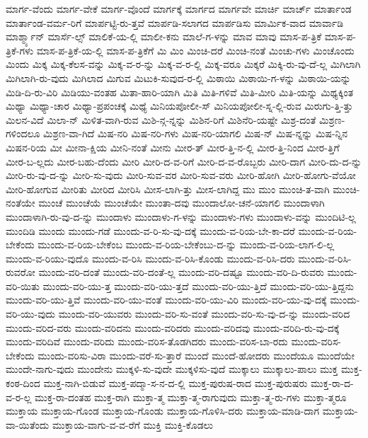 {ಮಾರ್ಗ-ವೆಂದು
ಮಾರ್ಗ-ವೇಕೆ
ಮಾರ್ಗ-ವೊಂದೆ
ಮಾರ್ಗಕ್ಕೆ
ಮಾರ್ಗದ
ಮಾರ್ಗವೇ
ಮಾರ್ಚಿ
ಮಾರ್ಚ್
ಮಾರ್ತಾಂಡ
ಮಾರ್ತಾಂಡ-ವರ್ಮ-ರಿಗೆ
ಮಾರ್ಪಟ್ಟಿ-ರು-ತ್ತವೆ
ಮಾರ್ಪಡಿ-ಸಲಾಗದ
ಮಾರ್ಪಡಿಸು
ಮಾರ್ಮಿಕ-ವಾದ
ಮಾರ್ವಾಡಿ
ಮಾರ್ಶ್ಮ್ಯಾನ್
ಮಾರ್ಸೆ-ಲ್ಸ್
ಮಾಲಿಕೆ-ಯ-ಲ್ಲಿ
ಮಾಲೀ-ಕನು
ಮಾಲೆ-ಗ-ಳನ್ನು
ಮಾವ
ಮಾವು
ಮಾಸ-ಪ-ತ್ರಿಕೆ
ಮಾಸ-ಪ-ತ್ರಿಕೆ-ಗಳು
ಮಾಸ-ಪ-ತ್ರಿಕೆ-ಯ-ಲ್ಲಿ
ಮಾಸ-ಪ-ತ್ರಿಕೆಗೆ
ಮಿ
ಮಿಂ
ಮಿಂಚಿ-ದರೆ
ಮಿಂಚಿ-ನಂತೆ
ಮಿಂಚು-ಗಳು
ಮಿಂಚೊಂದು
ಮಿಂದು
ಮಿಕ್ಕ
ಮಿಕ್ಕ-ಕೆಲಸ-ವನ್ನು
ಮಿಕ್ಕ-ವ-ರ-ನ್ನು
ಮಿಕ್ಕ-ವ-ರ-ಲ್ಲಿ
ಮಿಕ್ಕ-ವರೂ
ಮಿಕ್ಕರೆ
ಮಿಕ್ಕಿ-ರು-ವು-ದೆ-ಲ್ಲ
ಮಿಗಿಲಾಗಿ
ಮಿಗಿಲಾಗಿ-ರು-ವುದು
ಮಿಗಿಲಾದ
ಮಿಗುವ
ಮಿಟುಕಿ-ಸುವುದ-ರ-ಲ್ಲಿ
ಮಿಠಾಯಿ
ಮಿಠಾಯಿ-ಗ-ಳನ್ನು
ಮಿಠಾಯಿ-ಯನ್ನು
ಮಿಡಿ-ದಿ-ರು-ವಿರಿ
ಮಿಡಿಯು-ವಂತಹ
ಮಿತಾ-ಹಾರಿ-ಯಾಗಿ
ಮಿತಿ
ಮಿತಿ-ಗಳಿವೆ
ಮಿತಿ-ಮೀರಿ
ಮಿತಿ-ಯನ್ನು
ಮಿಥ್ಯಕ್ಕಿಂತ
ಮಿಥ್ಯಾ
ಮಿಥ್ಯಾ-ಚಾರ
ಮಿಥ್ಯಾ-ಪ್ರಪಂಚಕ್ಕೆ
ಮಿಥ್ಯೆ
ಮಿನಿಯಪೋಲೀ-ಸ್
ಮಿನಿಯಪೋಲೀ-ಸ್ನ-ಲ್ಲಿ-ರುವ
ಮಿರುಗು-ತ್ತಿ-ತ್ತು
ಮಿಲನ-ವಿದೆ
ಮಿಲಾ-ನ್
ಮಿಳಿತ-ವಾಗಿ-ರುವ
ಮಿಶಿ-ನ್ಗ-ನ್ನನ್ನು
ಮಿಶಿನ-ರಿಗೆ
ಮಿಶಿನೆರಿ-ಯಷ್ಟೇ
ಮಿಶ್ರ-ದಂತೆ
ಮಿಶ್ರಣ-ಗಳಿಂದಲೂ
ಮಿಶ್ರಣ-ವಾ-ಗಿದೆ
ಮಿಷ-ನರಿ
ಮಿಷ-ನರಿ-ಗಳು
ಮಿಷ-ನರಿ-ಯಾಗಲಿ
ಮಿಷ-ನ್
ಮಿಷ-ನ್ನನ್ನು
ಮಿಷ-ನ್ನಿನ
ಮಿಷನ-ರಿಯ
ಮೀ
ಮೀನಾ-ಕ್ಷಿಯ
ಮೀನಿ-ನಂತೆ
ಮೀನು
ಮೀರ-ತ್
ಮೀರ-ತ್ತಿ-ನ-ಲ್ಲಿ
ಮೀರ-ತ್ತಿ-ನಿಂದ
ಮೀರ-ತ್ತಿಗೆ
ಮೀರ-ಬ-ಲ್ಲದು
ಮೀರ-ಬಹು-ದೆಂದು
ಮೀರಿ
ಮೀರಿ-ದ-ವ-ರಿಗೆ
ಮೀರಿ-ದ-ವ-ರೊಬ್ಬರು
ಮೀರಿ-ದಾಗ
ಮೀರಿ-ದು-ದ-ನ್ನು
ಮೀರಿ-ರು-ವು-ದ-ನ್ನು
ಮೀರಿ-ಸು-ವುದು
ಮೀರಿ-ಸುವ-ವರ
ಮೀರಿ-ಸುವ-ವರು
ಮೀರಿ-ಹೋಗಿ
ಮೀರಿ-ಹೋಗು-ವೆಯೋ
ಮೀರಿ-ಹೋಗುವ
ಮೀರಿತು
ಮೀರಿದ
ಮೀರಿಸಿ
ಮೀಸ-ಲಾಗಿ-ತ್ತು
ಮೀಸ-ಲಾಗಿದ್ದ
ಮು
ಮುಂ
ಮುಂಚಿ-ತ-ವಾಗಿ
ಮುಂಚಿ-ನಂತೆಯೇ
ಮುಂಚೆ
ಮುಂಚೆಯೆ
ಮುಂಚೆಯೇ
ಮುಂತಾ-ದವು
ಮುಂದಾಲೋ-ಚನೆ-ಯಾಗಲಿ
ಮುಂದಾಳಾಗಿ
ಮುಂದಾಳಾಗಿ-ರು-ವು-ದ-ನ್ನು
ಮುಂದಾಳು
ಮುಂದಾಳು-ಗ-ಳನ್ನು
ಮುಂದಾಳು-ಗಳು
ಮುಂದಾಳು-ವನ್ನು
ಮುಂದಿಟಿ-ಲ್ಲ
ಮುಂದಿಡಿ
ಮುಂದು
ಮುಂದು-ಗಡೆ
ಮುಂದು-ವ-ರಿ-ಸು-ವು-ದಕ್ಕೆ
ಮುಂದು-ವ-ರಿಯ-ಬೇ-ಕಾ-ದರೆ
ಮುಂದು-ವ-ರಿಯ-ಬೇಕೆಂದು
ಮುಂದು-ವ-ರಿಯ-ಬೇಕೆಂಬ
ಮುಂದು-ವ-ರಿಯ-ಬೇಕೆಂಬು-ದ-ನ್ನು
ಮುಂದು-ವ-ರಿಯ-ಲಾಗ-ಲಿ-ಲ್ಲ
ಮುಂದು-ವ-ರಿಯು-ವುದೊ
ಮುಂದು-ವ-ರಿಸಿ
ಮುಂದು-ವ-ರಿಸಿ-ಕೊಂಡು
ಮುಂದು-ವ-ರಿಸಿ-ದರು
ಮುಂದು-ವ-ರಿಸಿ-ರುವರೋ
ಮುಂದು-ವರಿ-ದಂತೆ
ಮುಂದು-ವರಿ-ದಂತೆ-ಲ್ಲ
ಮುಂದು-ವರಿ-ದಷ್ಟೂ
ಮುಂದು-ವರಿ-ದಿ-ರುವರು
ಮುಂದು-ವರಿ-ಯಿತು
ಮುಂದು-ವರಿ-ಯು-ತ್ತ
ಮುಂದು-ವರಿ-ಯು-ತ್ತದೆ
ಮುಂದು-ವರಿ-ಯು-ತ್ತಿದೆ
ಮುಂದು-ವರಿ-ಯು-ತ್ತಿದ್ದನು
ಮುಂದು-ವರಿ-ಯು-ತ್ತಿವೆ
ಮುಂದು-ವರಿ-ಯು-ವಂತೆ
ಮುಂದು-ವರಿ-ಯು-ವಿರಿ
ಮುಂದು-ವರಿ-ಯು-ವು-ದಕ್ಕೆ
ಮುಂದು-ವರಿ-ಯು-ವುದು
ಮುಂದು-ವರಿ-ಯುವರು
ಮುಂದು-ವರಿ-ಸು-ವಂತೆ
ಮುಂದು-ವರಿ-ಸು-ವು-ದ-ನ್ನು
ಮುಂದು-ವರಿದ
ಮುಂದು-ವರಿದ-ವರು
ಮುಂದು-ವರಿದನು
ಮುಂದು-ವರಿದರು
ಮುಂದು-ವರಿದವು
ಮುಂದು-ವರಿದಿ-ರು-ವು-ದಕ್ಕೆ
ಮುಂದು-ವರಿದಿವೆ
ಮುಂದು-ವರಿದು
ಮುಂದು-ವರಿಸ-ತೊಡಗಿದರು
ಮುಂದು-ವರಿಸ-ಬಾ-ರದು
ಮುಂದು-ವರಿಸ-ಬೇಕೆಂದು
ಮುಂದು-ವರಿಸು-ವಿರಾ
ಮುಂದು-ವರೆ-ಸು-ತ್ತಾರೆ
ಮುಂದೆ
ಮುಂದೆ-ಹೋದರು
ಮುಂದೆಯೂ
ಮುಂದೆಯೇ
ಮುಂದೇ-ನಾಗು-ವುದು
ಮುಂದೇನು
ಮುಕ್ಕಳಿ-ಸು-ವುದೇ
ಮುಕ್ಕಳಿಸು-ವುದೆ
ಮುಕ್ಕಾಲು
ಮುಕ್ಕಾಲು-ಪಾಲು
ಮುಕ್ತ
ಮುಕ್ತ-ಕಂಠ-ದಿಂದ
ಮುಕ್ತ-ನಾಗಿ-ಬಿಡುವೆ
ಮುಕ್ತ-ಪದ್ಮಾ-ಸ-ನ-ದ-ಲ್ಲಿ
ಮುಕ್ತ-ಪುರುಷ-ರಾದ
ಮುಕ್ತ-ಪುರುಷರು
ಮುಕ್ತ-ರಾ-ದ-ವ-ರ-ಲ್ಲ
ಮುಕ್ತ-ರಾ-ದಂತಹ
ಮುಕ್ತ-ರಾಗಿ
ಮುಕ್ತಾ-ತ್ಮ
ಮುಕ್ತಾ-ತ್ಮ-ರಾಗುವುದು
ಮುಕ್ತಾ-ತ್ಮ-ರು-ಗಳು
ಮುಕ್ತಾ-ತ್ಮರೂ
ಮುಕ್ತಾಯ
ಮುಕ್ತಾಯ-ಗೊಂಡ
ಮುಕ್ತಾಯ-ಗೊಂಡು
ಮುಕ್ತಾಯ-ಗೊಳಿಸಿ-ದರು
ಮುಕ್ತಾಯ-ಮಾಡಿ-ದಾಗ
ಮುಕ್ತಾಯ-ವಾ-ಯಿತೆಂದು
ಮುಕ್ತಾಯ-ವಾಗು-ವ-ವ-ರೆಗೆ
ಮುಕ್ತಿ
ಮುಕ್ತಿ-ಕೊಡಲು
}
